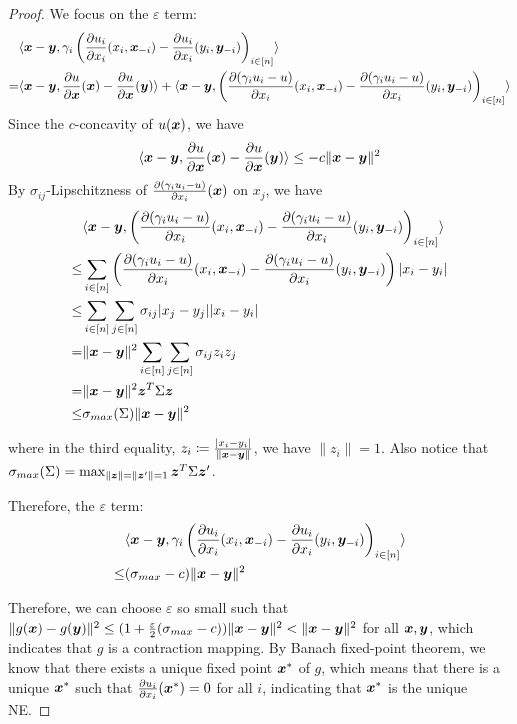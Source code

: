 \begin{proof}
We focus on the $\varepsilon$ term:
\begin{align*}
    & \langle {\bm{x}} - {\bm{y}}, \gamma_i \left( \frac{\partial u_i}{\partial x_i}(x_i,{\bm{x}}_{-i}) - \frac{\partial u_i}{\partial x_i}(y_i,{\bm{y}}_{-i}) \right)_{i\in[n]} \rangle
    \\
    =& \langle {\bm{x}} - {\bm{y}}, \frac{\partial u}{\partial {\bm{x}}}({\bm{x}}) - \frac{\partial u}{\partial {\bm{x}}}({\bm{y}}) \rangle
    + \langle {\bm{x}} - {\bm{y}}, \left( \frac{\partial (\gamma_i u_i - u)}{\partial x_i}(x_i,{\bm{x}}_{-i}) - \frac{\partial (\gamma_i u_i - u)}{\partial x_i}(y_i,{\bm{y}}_{-i}) \right)_{i\in[n]} \rangle
\end{align*}
Since the $c$-concavity of $u({\bm{x}})$, we have
\begin{align*}
    \langle {\bm{x}} - {\bm{y}}, \frac{\partial u}{\partial {\bm{x}}}({\bm{x}}) - \frac{\partial u}{\partial {\bm{x}}}({\bm{y}}) \rangle \le -c \| {\bm{x}} - {\bm{y}} \|^2
\end{align*}
By $\sigma_{ij}$-Lipschitzness of $\frac{\partial (\gamma_i u_i - u)}{\partial x_i}({\bm{x}})$ on $x_j$, we have
\begin{align*}
    & \langle {\bm{x}} - {\bm{y}}, \left( \frac{\partial (\gamma_i u_i - u)}{\partial x_i}(x_i,{\bm{x}}_{-i}) - \frac{\partial (\gamma_i u_i - u)}{\partial x_i}(y_i,{\bm{y}}_{-i}) \right)_{i\in[n]} \rangle 
    \\
    \le& \sum_{i\in[n]} \left( \frac{\partial (\gamma_i u_i - u)}{\partial x_i}(x_i,{\bm{x}}_{-i}) - \frac{\partial (\gamma_i u_i - u)}{\partial x_i}(y_i,{\bm{y}}_{-i}) \right) |x_i - y_i|
    \\
    \le& \sum_{i\in[n]} \sum_{j\in[n]} \sigma_{ij} |x_j - y_j| |x_i-y_i|
    \\
    =& \| {\bm{x}} - {\bm{y}} \|^2 \sum_{i\in[n]} \sum_{j\in[n]} \sigma_{ij} z_i z_j
    \\
    =& \| {\bm{x}} - {\bm{y}} \|^2 {\bm{z}}^T \Sigma {\bm{z}}
    \\
    \le& \sigma_{max}(\Sigma) \| {\bm{x}} - {\bm{y}} \|^2
\end{align*} 

where in the third equality, $z_i \coloneqq \frac{|x_i - y_i|}{\| {\bm{x}} - {\bm{y}}\|}$, we have $\| z_i \| = 1$. Also notice that $\sigma_{max}(\Sigma) = \max_{\|{\bm{z}}\| = \|{\bm{z}}'\| = 1} {\bm{z}}^T \Sigma {\bm{z}}'$.

Therefore, the $\varepsilon$ term:
\begin{align*}
    & \langle {\bm{x}} - {\bm{y}}, \gamma_i\left( \frac{\partial u_i}{\partial x_i}(x_i,{\bm{x}}_{-i}) - \frac{\partial u_i}{\partial x_i}(y_i,{\bm{y}}_{-i}) \right)_{i\in[n]} \rangle
    \\
    \le& (\sigma_{max} - c) \| {\bm{x}} - {\bm{y}} \|^2
\end{align*}

Therefore, we can choose $\varepsilon$ so small such that $\| g({\bm{x}}) - g({\bm{y}}) \|^2 \le (1 + \frac{\varepsilon}{2}(\sigma_{max} - c)) \| {\bm{x}} - {\bm{y}} \|^2 < \| {\bm{x}} - {\bm{y}} \|^2$ for all ${\bm{x}},{\bm{y}}$, which indicates that $g$ is a contraction mapping. By Banach fixed-point theorem, we know that there exists a unique fixed point ${\bm{x}}^*$ of $g$, which means that there is a unique ${\bm{x}}^*$ such that $\frac{\partial u_i}{\partial x_i}({\bm{x}}^*) = 0$ for all $i$, indicating that ${\bm{x}}^*$ is the unique NE.


\end{proof}
